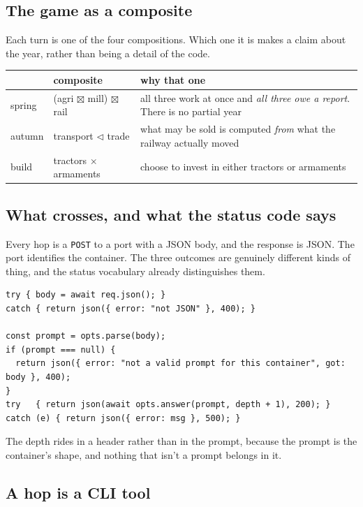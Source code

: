 \documentclass[11pt,a4paper]{article}
\begin{document}
\subsection{The game as a composite}

Each turn is one of the four compositions. Which one it is makes a claim about the year, rather
than being a detail of the code.

\begin{center}\small
\begin{tabular}{@{}llp{62mm}@{}}
\toprule
& \textbf{composite} & \textbf{why that one} \\
\midrule
spring & (agri $\boxtimes$ mill) $\boxtimes$ rail & all three work at once and \emph{all three
owe a report}. There is no partial year \\[1mm]
autumn & transport $\lhd$ trade & what may be sold is computed \emph{from} what the railway
actually moved \\[1mm]
build  & tractors $\times$ armaments & choose to invest in either tractors or armaments \\
\bottomrule
\end{tabular}
\end{center}

\subsection{What crosses, and what the status code says}

Every hop is a \texttt{POST} to a port with a JSON body, and the response is JSON. The port
identifies the container. The three outcomes are genuinely different kinds of
thing, and the status vocabulary already distinguishes them.

\begin{lstlisting}[language=TS]
try { body = await req.json(); }
catch { return json({ error: "not JSON" }, 400); }

const prompt = opts.parse(body);
if (prompt === null) {
  return json({ error: "not a valid prompt for this container", got: body }, 400);
}
try   { return json(await opts.answer(prompt, depth + 1), 200); }
catch (e) { return json({ error: msg }, 500); }
\end{lstlisting}


The depth rides in a header rather than in the prompt, because the prompt is the container's shape,
and nothing that isn't a prompt belongs in it.

\subsection{A hop is a CLI tool}
\end{document}
